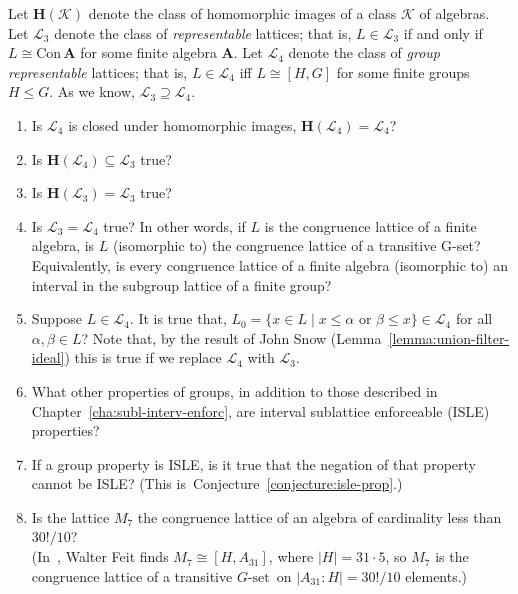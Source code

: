 \documentclass[cm,dissertation]{uhthesis}
\theoremstyle{plain}
\theoremstyle{definition}
\newcounter{conjecture}
\theoremstyle{remark}
\numberwithin{theorem}{section}
\numberwithin{claim}{chapter}
\numberwithin{equation}{section}
\numberwithin{conjecture}{chapter}
\newcommand{\<}{\ensuremath{\langle}}
\renewcommand{\>}{\ensuremath{\rangle}}
\renewcommand{\leq}{\ensuremath{\leqslant}}
\newcommand{\Con}{\ensuremath{\mathrm{Con\,}}}
\newcommand{\0}{\ensuremath{\mathbf{0}}}
\newcommand{\1}{\ensuremath{\mathbf{1}}}
\newcommand{\2}{\ensuremath{\mathbf{2}}}
\newcommand{\3}{\ensuremath{\mathbf{3}}}
\newcommand{\4}{\ensuremath{\mathbf{4}}}
\newcommand{\5}{\ensuremath{\mathbf{5}}}
\newcommand{\bA}{\ensuremath{\mathbf{A}}}
\newcommand{\bH}{\ensuremath{\mathbf{H}}}
\newcommand{\sK}{\ensuremath{\mathscr{K}}}
\newcommand{\sL}{\ensuremath{\mathscr{L}}}
\newcommand{\ISLE}{{\small ISLE}}
\newcommand{\Gset}{\ensuremath{G\text{-set}}}
\begin{document}
Let $\bH(\sK)$ denote the class of homomorphic images of a class $\sK$
of algebras.
Let $\sL_3$ denote the class of 
\emph{representable} lattices; that is,
$L \in \sL_3$ if and only if $L \cong \Con \bA$ for some finite algebra $\bA$.
Let $\sL_{4}$ denote the class of 
\emph{group representable} lattices; that is, $L \in \sL_{4}$ iff $L\cong [H, G]$ for some
finite groups $H\leq G$.
As we know, $\sL_3 \supseteq \sL_4$.
\begin{enumerate}
\item  Is $\sL_4$ is closed under homomorphic images, $\bH(\sL_4) = \sL_4$?  

\item Is $\bH(\sL_4) \subseteq \sL_3$ true?

\item Is $\bH(\sL_3) = \sL_3$ true?

\item Is $\sL_3 = \sL_4$ true?
In other words, if $L$ is %
the congruence lattice of a finite
algebra, is $L$ (isomorphic to) the congruence lattice of a transitive G-set?
Equivalently, is every congruence lattice of a finite algebra (isomorphic to) an
interval in the subgroup lattice of a finite group?  

\item Suppose $L \in \sL_4$. %
It is true that, 
$L_0 = \{ x\in L \mid x \leq \alpha \text{ or } \beta \leq x \} \in \sL_4$
for all $\alpha, \beta \in L$?  Note that, by the result of 
%
John Snow (Lemma~\ref{lemma:union-filter-ideal}) 
this is true if we replace $\sL_4$ with $\sL_3$.

\item What other properties of groups, in addition to those described in
  Chapter~\ref{cha:subl-interv-enforc}, are interval sublattice enforceable
  (\ISLE) properties?

\item If a group property is \ISLE, is it true that the negation of that property cannot be \ISLE?
(This is~Conjecture~\ref{conjecture:isle-prop}.)

\item Is the lattice $M_7$ the congruence lattice of an algebra of cardinality
  less than $30!/10$?\\
(In~\cite{Feit:1983},  
%
Walter Feit finds $M_7 \cong [H,A_{31}]$, where
  $|H|=31\cdot 5$, so $M_7$ is the congruence lattice of a transitive \Gset\ on
  $|A_{31}:H| = 30!/10$ elements.)


\end{enumerate}
\end{document}

